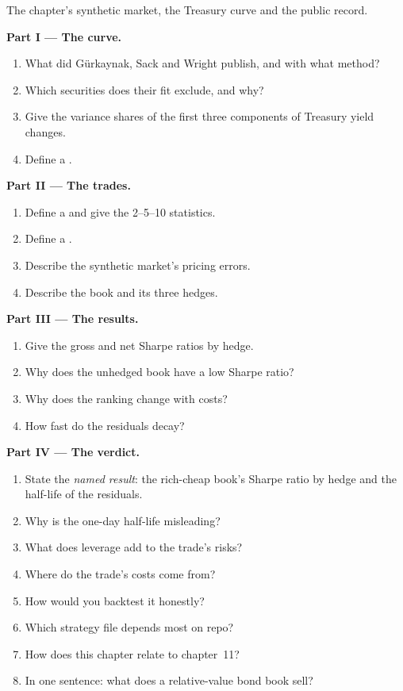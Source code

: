 \begin{problem}\label{pb:s2:government-bond-relative-value:1}
The chapter's synthetic market, the Treasury curve and the public record.

\medskip\noindent\textbf{Part I --- The curve.}
\begin{enumerate}
\item What did Gürkaynak, Sack and Wright publish, and with what method?
\item Which securities does their fit exclude, and why?
\item Give the variance shares of the first three components of Treasury yield changes.
\item Define a .
\end{enumerate}

\medskip\noindent\textbf{Part II --- The trades.}
\begin{enumerate}[resume]
\item Define a  and give the 2--5--10 statistics.
\item Define a .
\item Describe the synthetic market's pricing errors.
\item Describe the book and its three hedges.
\end{enumerate}

\medskip\noindent\textbf{Part III --- The results.}
\begin{enumerate}[resume]
\item Give the gross and net Sharpe ratios by hedge.
\item Why does the unhedged book have a low Sharpe ratio?
\item Why does the ranking change with costs?
\item How fast do the residuals decay?
\end{enumerate}

\medskip\noindent\textbf{Part IV --- The verdict.}
\begin{enumerate}[resume]
\item State the \emph{named result}: the rich-cheap book's Sharpe ratio by hedge and the half-life of the residuals.
\item Why is the one-day half-life misleading?
\item What does leverage add to the trade's risks?
\item Where do the trade's costs come from?
\item How would you backtest it honestly?
\item Which strategy file depends most on repo?
\item How does this chapter relate to chapter~11?
\item In one sentence: what does a relative-value bond book sell?
\end{enumerate}
\end{problem}


